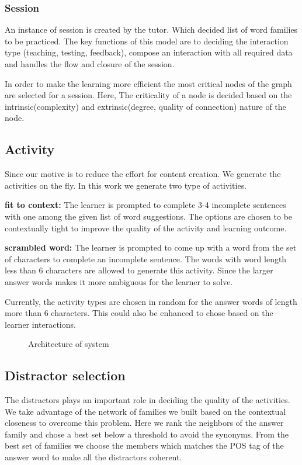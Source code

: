 \documentclass[11pt,a4paper]{article}
\begin{document}
\subsubsection{Session}
An instance of session is created by the tutor. Which decided list of word
families to be practiced. The key functions of this model are to deciding the
interaction type (teaching, testing, feedback), compose an interaction with all
required data and handles the flow and closure of the session.

In order to make the learning more efficient the most critical nodes of the
graph are selected for a session. Here, The criticality of a node is decided
based on the intrinsic(complexity) and extrinsic(degree, quality of connection)
nature of the node.


\subsection{Activity}
Since our motive is to reduce the effort for content creation. We generate the
activities on the fly. In this work we generate two type of activities. 

\textbf{fit to context:} The learner is prompted to complete 3-4 incomplete
sentences with one among the given list of word suggestions. The options are
chosen to be contextually tight to improve the quality of the activity and
learning outcome.

\textbf{scrambled word:} The learner is prompted to come up with a word from the
set of characters to complete an incomplete sentence. The words with word length
less than 6 characters are allowed to generate this activity. Since the larger
answer words makes it more ambiguous for the learner to solve.

Currently, the activity types are chosen in random for the answer words of length
more than 6 characters. This could also be enhanced to chose based on the learner
interactions.

\begin{figure}
\begin{tcbraster}[raster columns=1, enhanced, blankest]
\caption{Architecture of system}

\end{tcbraster}
\end{figure}

\subsection{Distractor selection}
The distractors plays an important role in deciding the quality of the activities.
We take advantage of the network of families we built based on the contextual
closeness to overcome this problem. Here we rank the neighbors of the
answer family and chose a best set below a threshold to avoid the synonyms. From
the best set of families we choose the members which matches the POS tag of the
answer word to make all the distractors coherent.
\end{document}
